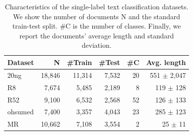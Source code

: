 \documentclass[lettersize,journal]{IEEEtran}
\begin{document}
\begin{table}[ht]
    \centering
    \caption{Characteristics of the single-label text classification datasets. 
    We show the number of documents N and
    the standard train-test split.
    \#C is the number of classes.
    Finally, we report the documents' average length and standard deviation.
    }
    \label{tab:datasets}
    \begin{tabular}{lrrrrr}
    \toprule
    \textbf{Dataset} & \textbf{N}       & \textbf{\#Train} & \textbf{\#Test}  & \textbf{\#C} & \textbf{Avg. length}   \\
    \midrule                                                              
    20ng    & 18,846  & 11,314  & 7,532   & 20        & 551 $\pm$ 2,047 \\
    R8      & 7,674   & 5,485   & 2,189   & 8         & 119 $\pm$ 128   \\
    R52     & 9,100   & 6,532   & 2,568   & 52        & 126 $\pm$ 133   \\
    ohsumed & 7,400   & 3,357   & 4,043   & 23        & 285 $\pm$ 123   \\
    MR      & 10,662  & 7,108   & 3,554   & 2         & 25 $\pm$ 11     \\
    \bottomrule
    \end{tabular}
\end{table}
\end{document}
